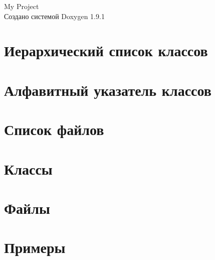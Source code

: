 \let\mypdfximage\pdfximage\def\pdfximage{\immediate\mypdfximage}\documentclass[twoside]{book}
\newcommand{\+}{\discretionary{\mbox{\scriptsize$\hookleftarrow$}}{}{}}
\newcommand{\clearemptydoublepage}{%
  \newpage{\pagestyle{empty}\cleardoublepage}%
}
\begin{document}
\raggedbottom

\hypersetup{pageanchor=false,
             bookmarksnumbered=true,
             pdfencoding=unicode
            }
\begin{titlepage}
\vspace*{7cm}
\begin{center}%
{\Large My Project }\\
\vspace*{1cm}
{\large Создано системой Doxygen 1.9.1}\\
\end{center}
\end{titlepage}
\clearemptydoublepage
{}
\tableofcontents
\clearemptydoublepage
{}
\hypersetup{pageanchor=true}

\chapter{Иерархический список классов}

\chapter{Алфавитный указатель классов}

\chapter{Список файлов}

\chapter{Классы}

\chapter{Файлы}


\chapter{Примеры}


\backmatter
\newpage
{}
\clearemptydoublepage
{}
\printindex
\end{document}
